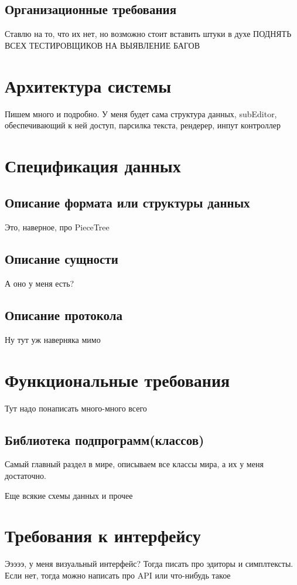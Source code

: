 \documentclass{fefu}
\begin{document}
	\subsection{Организационные требования}
	\par Ставлю на то, что их нет, но возможно стоит вставить штуки в духе ПОДНЯТЬ ВСЕХ ТЕСТИРОВЩИКОВ НА ВЫЯВЛЕНИЕ БАГОВ
	
	\section{Архитектура системы}
	\par Пишем много и подробно. У меня будет сама структура данных, subEditor, обеспечивающий к ней доступ, парсилка текста, рендерер, инпут контроллер
	
	\section{Спецификация данных}
	\subsection{Описание формата или структуры данных}
	\par Это, наверное, про PieceTree
	\subsection{Описание сущности}
	\par А оно у меня есть?
	\subsection{Описание протокола}
	\par Ну тут уж наверняка мимо
	
	\section{Функциональные требования}
	\par Тут надо понаписать много-много всего
	\subsection{Библиотека подпрограмм(классов)}
	\par Самый главный раздел в мире, описываем все классы мира, а их у меня достаточно.
	\par Еще всякие схемы данных и прочее
	
	\section{Требования к интерфейсу}
	\par Эээээ, у меня визуальный интерфейс? Тогда писать про эдиторы и симплтексты. Если нет, тогда можно написать про API или что-нибудь такое
	
\end{document}
